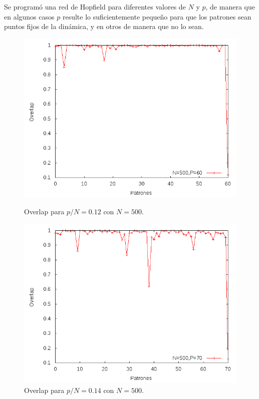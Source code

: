 \documentclass[aps,prb,onecolumn,10pt,floatfix,superscriptaddress]{article} %
\begin{document}
Se program\'o una red de Hopfield para diferentes valores de $N$ y $p$, de manera que en algunos casos $p$ resulte lo suficientemente peque\~no para que los patrones sean puntos fijos de la din\'amica, y en otros de manera que no lo sean.

\begin{figure}[!htd] 
	\begin{minipage}[b]{0.450\linewidth}
   	    \includegraphics[scale=0.32 ]{12.png}
   	    \begin{center}
  \caption{\label{12} Overlap para $p/N = 0.12$ con $N=500$.}
     	    \end{center}
   \end{minipage}
   \begin{minipage}[b]{0.450\linewidth}
   	    \includegraphics[scale=0.32 ]{14.png}
   	     \begin{center}
  \caption{\label{14} Overlap para $p/N = 0.14$ con $N=500$.}
     	    \end{center}
   \end{minipage}  
 \end{figure}
\end{document}
